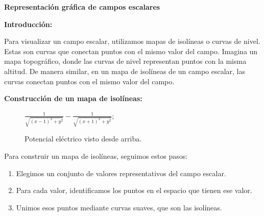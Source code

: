 \documentclass{article}
\begin{document}
\textbf{Representación gráfica de campos escalares}

\textbf{Introducción:}

Para visualizar un campo escalar, utilizamos mapas de isolíneas o curvas de nivel. Estas son curvas que conectan puntos con el mismo valor del campo. Imagina un mapa topográfico, donde las curvas de nivel representan puntos con la misma altitud. De manera similar, en un mapa de isolíneas de un campo escalar, las curvas conectan puntos con el mismo valor del campo.
    
\textbf{Construcción de un mapa de isolíneas:}
\begin{wrapfigure}{r}{0.4\textwidth} %
    \centering
    $\frac{1}{\sqrt{(x-1)^2 + y^2}} - \frac{1}{\sqrt{(x+1)^2 + y^2}}$; %
    \caption{Potencial eléctrico visto desde arriba.}
\end{wrapfigure}

Para construir un mapa de isolíneas, seguimos estos pasos:

\begin{enumerate}
\item Elegimos un conjunto de valores representativos del campo escalar.
\item Para cada valor, identificamos los puntos en el espacio que tienen ese valor.
\item Unimos esos puntos mediante curvas suaves, que son las isolíneas.
\end{enumerate}
\end{document}
